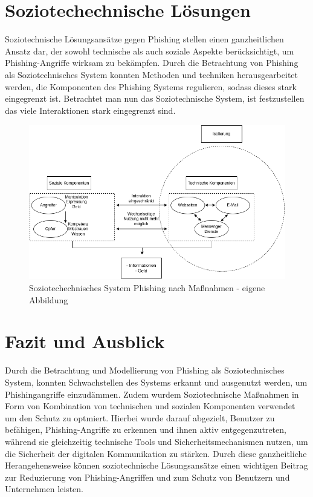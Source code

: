 \documentclass[journal=tosc,final]{iacrtrans}
\begin{document}
\section{Soziotechechnische Lösungen}
Soziotechnische Lösungsansätze gegen Phishing stellen einen ganzheitlichen Ansatz dar, der sowohl technische als auch soziale Aspekte berücksichtigt, um Phishing-Angriffe wirksam zu bekämpfen.
Durch die Betrachtung von Phishing als Soziotechnisches System konnten Methoden und techniken herausgearbeitet werden, die Komponenten des Phishing Systems regulieren, sodass dieses stark eingegrenzt ist. Betrachtet man nun das Soziotechnische System, ist festzustellen das viele Interaktionen stark eingegrenzt sind.
\begin{figure}[h]
 \caption{Soziotechechnisches System Phishing nach Maßnahmen - eigene Abbildung}
 \centering \includegraphics[scale=0.5]{iso.png}
\end{figure}

\section{Fazit und Ausblick}
Durch die Betrachtung und Modellierung von Phishing als Soziotechnisches System, konnten Schwachstellen des Systems erkannt und ausgenutzt werden, um Phishingangriffe einzudämmen. Zudem wurdem Soziotechnische Maßnahmen in Form von Kombination von technischen und sozialen Komponenten verwendet um den Schutz zu optmiert. Hierbei wurde darauf abgezielt, Benutzer zu befähigen, Phishing-Angriffe zu erkennen und ihnen aktiv entgegenzutreten, während sie gleichzeitig technische Tools und Sicherheitsmechanismen nutzen, um die Sicherheit der digitalen Kommunikation zu stärken. Durch diese ganzheitliche Herangehensweise können soziotechnische Lösungsansätze einen wichtigen Beitrag zur Reduzierung von Phishing-Angriffen und zum Schutz von Benutzern und Unternehmen leisten.
\newpage
\end{document}
